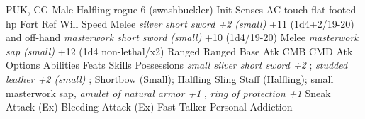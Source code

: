 PUK, CG Male Halfling rogue 6 (swashbuckler)  Init Senses  AC touch flat-footed  hp  Fort Ref Will  Speed  Melee  {\itshape silver short sword +2 (small)} +11 (1d4+2/19-20) and off-hand  {\itshape masterwork short sword (small)} +10 (1d4/19-20)  Melee  {\itshape masterwork sap (small)} +12 (1d4 non-lethal/x2)  Ranged  Ranged  Base Atk CMB CMD  Atk Options  Abilities  Feats  Skills  Possessions  {\itshape small silver short sword +2} ;  {\itshape studded leather +2 (small)} ; Shortbow (Small); Halfling Sling Staff (Halfling); small masterwork sap,  {\itshape amulet of natural armor +1} ,  {\itshape ring of protection +1}  Sneak Attack (Ex)  Bleeding Attack (Ex) Fast-Talker  Personal Addiction 